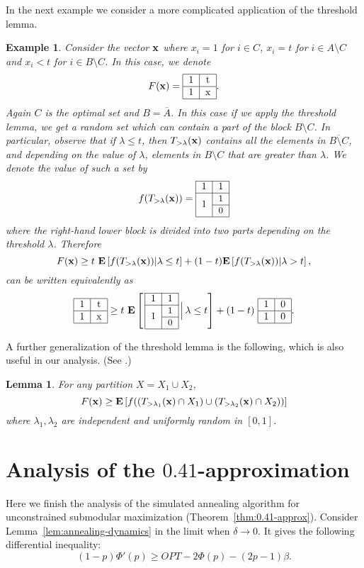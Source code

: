 \documentclass{article}[11pt]
\newtheorem{lemma}[theorem]{Lemma}
\newtheorem{example}[theorem]{Example}
\newcommand{\E}[1]{{\bf{E}}\left[#1\right]}
\newcommand{\T}[4] {\begin{tabular}{|c|c|}
\hline
#1 & #2 \\
\hline
#3 & #4 \\
\hline
\end{tabular}}
\newcommand{\TTR}[5]{\begin{tabular}{|c|c|l}
\cline{1-2}
#1 & #2 \\
\cline{1-2}
\multirow{2}{*}{#3} & {\small{#4}} \\
\cline{2-2}
& {\small{#5}} \\
\cline{1-2}
\end{tabular}}
\def\bx{{\bf x}}
\begin{document}
In the next example we consider a more complicated application of the threshold lemma.
\begin{example}
Consider the vector  $\bx$ where $x_i=1$ for  $i\in C$, $x_i=t$ for $i\in A\setminus C$ and $x_i<t$ for $i\in B\setminus C$. In this case, we denote
$$ F(\bx) = \T{1}{t}{1}{x}.$$
Again $C$ is the optimal set and $B=\overline{A}$. In this case if we apply the threshold lemma,
we get a random set which can contain a part of the block $B \setminus C$.
In particular, observe that if $\lambda \leq t$, then $T_{>\lambda}(\bx)$ contains all the
elements in $\overline{B\setminus C}$, and depending on the value of $\lambda$,  elements in $B\setminus C$ that are greater than $\lambda$. We denote the value of such a set by 
$$ f(T_{>\lambda}(\bx)) = \TTR{1}{1}{1}{1}{0} $$
where the right-hand lower block is divided into two parts depending on the threshold $\lambda$.
Therefore 
\begin{equation*}
F(\bx)\geq t~ \E{f(T_{>\lambda}(\bx)) | \lambda \leq t}
 + (1-t)\E{f(T_{>\lambda}(\bx)) | \lambda > t },
\end{equation*}
can be written equivalently as
\begin{equation}
\label{eq:threshold_hard}
\T{1}{t}{1}{x} \geq  t~\E{\, \TTR{1}{1}{1}{1}{0} \, \Big| \, \lambda \leq t}
  +(1-t)~\T{1}{0}{1}{0}.
\end{equation}
\end{example}


A further generalization of the threshold lemma is the following, which is also useful
in our analysis. (See \cite[Lemma A.5]{Vondrak09}.)

\begin{lemma}
\label{lem:threshold2}
For any partition $X = X_1 \cup X_2$,
$$ F(\bx) \geq \E{f((T_{>\lambda_1}(\bx) \cap X_1) \cup (T_{>\lambda_2}(\bx) \cap X_2))} $$
where $\lambda_1,\lambda_2$ are independent and uniformly random in $[0,1]$.
\end{lemma}



\section{Analysis of the $0.41$-approximation}
\label{app:unconstrained}

Here we finish the analysis of the simulated annealing algorithm
for unconstrained submodular maximization (Theorem~\ref{thm:0.41-approx}).
Consider Lemma~\ref{lem:annealing-dynamics} in the limit when $\delta \rightarrow 0$.
It gives the following differential inequality:
\begin{equation}
\label{eq:diff-eq}
(1-p) \Phi'(p) \geq OPT - 2 \Phi(p) - (2p-1) \beta.
\end{equation}
\end{document}
